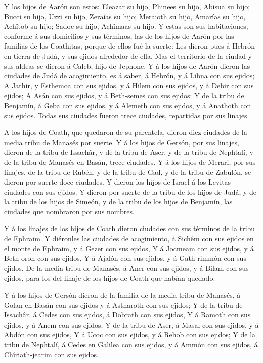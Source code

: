  Y los hijos de Aarón son estos: Eleazar su hijo, Phinees
su hijo, Abisua su hijo;  Bucci su hijo, Uzzi su hijo,
Zeraías su hijo;  Meraioth su hijo, Amarías su hijo,
Achîtob su hijo;  Sadoc su hijo, Achîmaas su hijo.
 Y estas son sus habitaciones, conforme á sus domicilios y
sus términos, las de los hijos de Aarón por las familias de los
Coathitas, porque de ellos fué la suerte:  Les dieron pues
á Hebrón en tierra de Judá, y sus ejidos alrededor de ella.
 Mas el territorio de la ciudad y sus aldeas se dieron á
Caleb, hijo de Jephone.  Y á los hijos de Aarón dieron las
ciudades de Judá de acogimiento, es á saber, á Hebrón, y á Libna con sus
ejidos;  A Jathir, y Esthemoa con sus ejidos, y á Hilem con
sus ejidos, y á Debir con sus ejidos;  A Asán con sus
ejidos, y á Beth-semes con sus ejidos:  Y de la tribu de
Benjamín, á Geba con sus ejidos, y á Alemeth con sus ejidos, y á
Anathoth con sus ejidos. Todas sus ciudades fueron trece ciudades,
repartidas por sus linajes.

 A los hijos de Coath, que quedaron de su parentela, dieron
diez ciudades de la media tribu de Manasés por suerte.  Y á
los hijos de Gersón, por sus linajes, dieron de la tribu de Issachâr, y
de la tribu de Aser, y de la tribu de Nephtalí, y de la tribu de Manasés
en Basán, trece ciudades.  Y á los hijos de Merari, por sus
linajes, de la tribu de Rubén, y de la tribu de Gad, y de la tribu de
Zabulón, se dieron por suerte doce ciudades.  Y dieron los
hijos de Israel á los Levitas ciudades con sus ejidos.  Y
dieron por suerte de la tribu de los hijos de Judá, y de la tribu de los
hijos de Simeón, y de la tribu de los hijos de Benjamín, las ciudades
que nombraron por sus nombres.

 Y á los linajes de los hijos de Coath dieron ciudades con
sus términos de la tribu de Ephraim.  Y diéronles las
ciudades de acogimiento, á Sichêm con sus ejidos en el monte de Ephraim,
y á Gezer con sus ejidos,  Y á Jocmeam con sus ejidos, y á
Beth-oron con sus ejidos,  Y á Ajalón con sus ejidos, y á
Gath-rimmón con sus ejidos.  De la media tribu de Manasés,
á Aner con sus ejidos, y á Bilam con sus ejidos, para los del linaje de
los hijos de Coath que habían quedado.

 Y á los hijos de Gersón dieron de la familia de la media
tribu de Manasés, á Golan en Basán con sus ejidos y á Astharoth con sus
ejidos;  Y de la tribu de Issachâr, á Cedes con sus ejidos,
á Dobrath con sus ejidos,  Y á Ramoth con sus ejidos, y á
Anem con sus ejidos;  Y de la tribu de Aser, á Masal con
sus ejidos, y á Abdón con sus ejidos,  Y á Ucoc con sus
ejidos, y á Rehob con sus ejidos;  Y de la tribu de
Nephtalí, á Cedes en Galilea con sus ejidos, y á Ammón con sus ejidos, á
Chîriath-jearim con sus ejidos.

